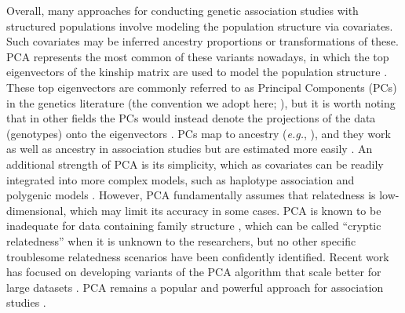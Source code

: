 \documentclass[11pt]{article}
\begin{document}
Overall, many approaches for conducting genetic association studies with structured populations involve modeling the population structure via covariates.
Such covariates may be inferred ancestry proportions \citep{pritchard_association_2000} or transformations of these.
PCA represents the most common of these variants nowadays, in which the top eigenvectors of the kinship matrix are used to model the population structure \citep{zhang_semiparametric_2003, price_principal_2006, bouaziz_accounting_2011}.
These top eigenvectors are commonly referred to as Principal Components (PCs) in the genetics literature (the convention we adopt here; \cite{patterson_population_2006}), but it is worth noting that in other fields the PCs would instead denote the projections of the data (genotypes) onto the eigenvectors \citep{jolliffe_principal_2002}.
PCs map to ancestry (\textit{e.g.}, \cite{zhou_strong_2016}), and they work as well as ancestry in association studies but are estimated more easily \citep{patterson_population_2006, zhao_arabidopsis_2007, bouaziz_accounting_2011}.
An additional strength of PCA is its simplicity, which as covariates can be readily integrated into more complex models, such as haplotype association \citep{xu_detecting_2014} and polygenic models \citep{qian_fast_2020}.
However, PCA fundamentally assumes that relatedness is low-dimensional, which may limit its accuracy in some cases.
PCA is known to be inadequate for data containing family structure \citep{patterson_population_2006, thornton_roadtrips:_2010, price_new_2010}, which can be called ``cryptic relatedness'' when it is unknown to the researchers, but no other specific troublesome relatedness scenarios have been confidently identified.
Recent work has focused on developing variants of the PCA algorithm that scale better for large datasets \citep{lee_sparse_2012, abraham_fast_2014, galinsky_fast_2016, abraham_flashpca2:_2017, agrawal_scalable_2020}.
PCA remains a popular and powerful approach for association studies \citep{wojcik_genetic_2019}.
\end{document}
